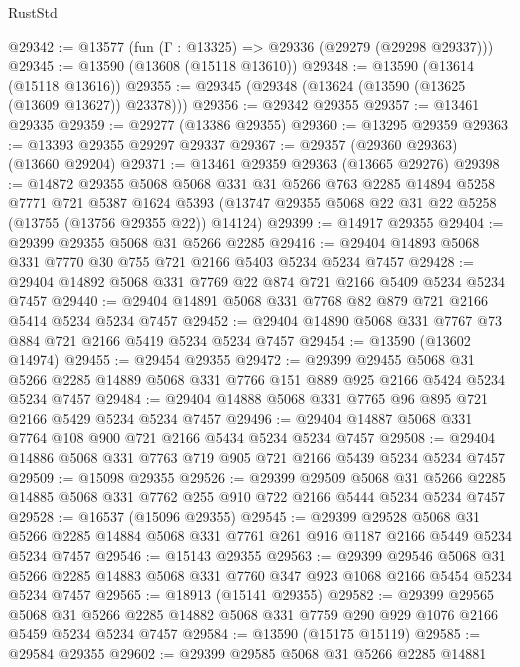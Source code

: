 \begin{lexlean}{RustStd}
\begin{coremodule}
@29342 := @13577 (fun (Γ : @13325) => @29336 (@29279 (@29298 @29337)))
@29345 := @13590 (@13608 (@15118 @13610))
@29348 := @13590 (@13614 (@15118 @13616))
@29355 := @29345 (@29348 (@13624 (@13590 (@13625 (@13609 @13627)) @23378)))
@29356 := @29342 @29355
@29357 := @13461 @29335
@29359 := @29277 (@13386 @29355)
@29360 := @13295 @29359
@29363 := @13393 @29355 @29297 @29337
@29367 := @29357 (@29360 @29363) (@13660 @29204)
@29371 := @13461 @29359 @29363 (@13665 @29276)
@29398 := @14872
    @29355
    @5068
    @5068
    @331
    @31
    @5266
    @763
    @2285
    @14894
    @5258
    @7771
    @721
    @5387
    @1624
    @5393
    (@13747 @29355 @5068 @22 @31 @22 @5258 (@13755 (@13756 @29355 @22)) @14124)
@29399 := @14917 @29355
@29404 := @29399 @29355 @5068 @31 @5266 @2285
@29416 := @29404 @14893 @5068 @331 @7770 @30 @755 @721 @2166 @5403 @5234 @5234 @7457
@29428 := @29404 @14892 @5068 @331 @7769 @22 @874 @721 @2166 @5409 @5234 @5234 @7457
@29440 := @29404 @14891 @5068 @331 @7768 @82 @879 @721 @2166 @5414 @5234 @5234 @7457
@29452 := @29404 @14890 @5068 @331 @7767 @73 @884 @721 @2166 @5419 @5234 @5234 @7457
@29454 := @13590 (@13602 @14974)
@29455 := @29454 @29355
@29472 := @29399
    @29455
    @5068
    @31
    @5266
    @2285
    @14889
    @5068
    @331
    @7766
    @151
    @889
    @925
    @2166
    @5424
    @5234
    @5234
    @7457
@29484 := @29404 @14888 @5068 @331 @7765 @96 @895 @721 @2166 @5429 @5234 @5234 @7457
@29496 := @29404 @14887 @5068 @331 @7764 @108 @900 @721 @2166 @5434 @5234 @5234 @7457
@29508 := @29404 @14886 @5068 @331 @7763 @719 @905 @721 @2166 @5439 @5234 @5234 @7457
@29509 := @15098 @29355
@29526 := @29399
    @29509
    @5068
    @31
    @5266
    @2285
    @14885
    @5068
    @331
    @7762
    @255
    @910
    @722
    @2166
    @5444
    @5234
    @5234
    @7457
@29528 := @16537 (@15096 @29355)
@29545 := @29399
    @29528
    @5068
    @31
    @5266
    @2285
    @14884
    @5068
    @331
    @7761
    @261
    @916
    @1187
    @2166
    @5449
    @5234
    @5234
    @7457
@29546 := @15143 @29355
@29563 := @29399
    @29546
    @5068
    @31
    @5266
    @2285
    @14883
    @5068
    @331
    @7760
    @347
    @923
    @1068
    @2166
    @5454
    @5234
    @5234
    @7457
@29565 := @18913 (@15141 @29355)
@29582 := @29399
    @29565
    @5068
    @31
    @5266
    @2285
    @14882
    @5068
    @331
    @7759
    @290
    @929
    @1076
    @2166
    @5459
    @5234
    @5234
    @7457
@29584 := @13590 (@15175 @15119)
@29585 := @29584 @29355
@29602 := @29399
    @29585
    @5068
    @31
    @5266
    @2285
    @14881

\end{coremodule}
\end{lexlean}
